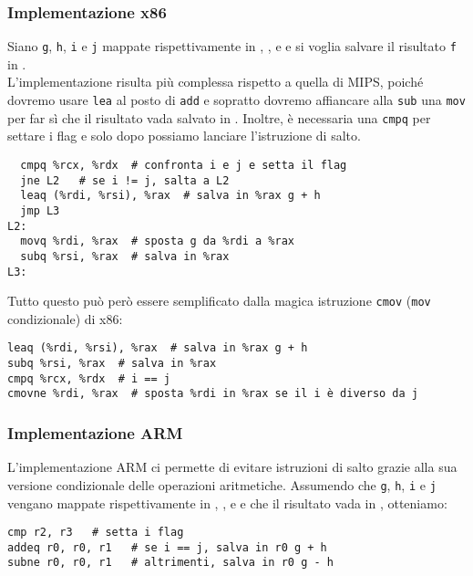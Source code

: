 \documentclass[class=book, crop=false, oneside]{standalone}
\begin{document}
\subsubsection*{Implementazione x86}
Siano \texttt{g}, \texttt{h}, \texttt{i} e \texttt{j} mappate rispettivamente in , ,  e  e si voglia salvare il risultato \texttt{f} in .\\
L'implementazione risulta più complessa rispetto a quella di MIPS, poiché dovremo usare \texttt{lea} al posto di \texttt{add} e sopratto dovremo affiancare alla \texttt{sub} una \texttt{mov} per far sì che il risultato vada salvato in . Inoltre, è necessaria una \texttt{cmpq} per settare i flag e solo dopo possiamo lanciare l'istruzione di salto.
\begin{verbatim}
  cmpq %rcx, %rdx  # confronta i e j e setta il flag
  jne L2   # se i != j, salta a L2
  leaq (%rdi, %rsi), %rax  # salva in %rax g + h
  jmp L3
L2:
  movq %rdi, %rax  # sposta g da %rdi a %rax
  subq %rsi, %rax  # salva in %rax
L3:
\end{verbatim}
Tutto questo può però essere semplificato dalla magica istruzione \texttt{cmov} (\texttt{mov} condizionale) di x86:
\begin{verbatim}
leaq (%rdi, %rsi), %rax  # salva in %rax g + h
subq %rsi, %rax  # salva in %rax
cmpq %rcx, %rdx  # i == j
cmovne %rdi, %rax  # sposta %rdi in %rax se il i è diverso da j
\end{verbatim}

\subsubsection*{Implementazione ARM}
L'implementazione ARM ci permette di evitare istruzioni di salto grazie alla sua versione condizionale delle operazioni aritmetiche. Assumendo che \texttt{g}, \texttt{h}, \texttt{i} e \texttt{j} vengano mappate rispettivamente in , ,  e  e che il risultato vada in , otteniamo:
\begin{verbatim}
cmp r2, r3   # setta i flag
addeq r0, r0, r1   # se i == j, salva in r0 g + h
subne r0, r0, r1   # altrimenti, salva in r0 g - h
\end{verbatim}
\end{document}
